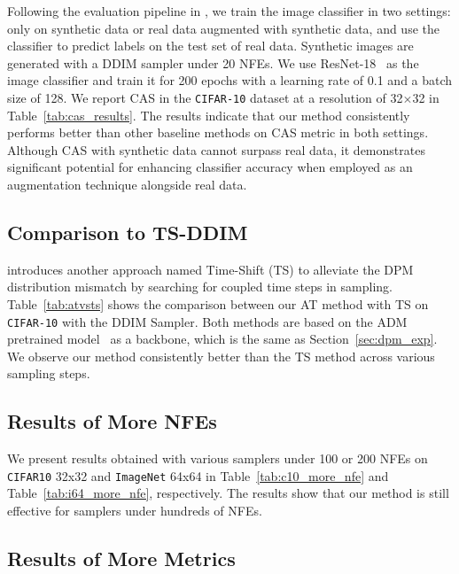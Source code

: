 Following the evaluation pipeline in \citet{ravuri2019cas}, we train the image classifier in two settings: only on synthetic data or real data augmented with synthetic data, and use the classifier to predict labels on the test set of real data.
Synthetic images are generated with a DDIM sampler under 20 NFEs.
We use ResNet-18~\citep{he2016deep} as the image classifier and train it for 200 epochs with a learning rate of 0.1 and a batch size of 128. 
We report CAS in the \texttt{CIFAR-10} dataset at a resolution of 32$\times$32 in Table~\ref{tab:cas_results}.
The results indicate that our method consistently performs better than other baseline methods on CAS metric in both settings. Although CAS with synthetic data cannot surpass real data, it demonstrates significant potential for enhancing classifier accuracy when employed as an augmentation technique alongside real data.


\subsection{Comparison to TS-DDIM}
\citet{li2024alleviating} introduces another approach named Time-Shift (TS) to alleviate the DPM distribution mismatch by searching for coupled time steps in sampling.
Table~\ref{tab:atvsts} shows the comparison between our AT method with TS on \texttt{CIFAR-10} with the DDIM Sampler.
Both methods are based on the ADM pretrained model~\citep{dhariwal2021diffusion} as a backbone, which is the same as Section~\ref{sec:dpm_exp}.
We observe our method consistently better than the TS method across various sampling steps.


\subsection{Results of More NFEs}
\label{app:more_nfes}



We present results obtained with various samplers under 100 or 200 NFEs on \texttt{CIFAR10} 32x32 and \texttt{ImageNet} 64x64 in Table~\ref{tab:c10_more_nfe} and Table~\ref{tab:i64_more_nfe}, respectively.
The results show that our method is still effective for samplers under hundreds of NFEs.



\subsection{Results of More Metrics}
\label{app:more_metrics}





